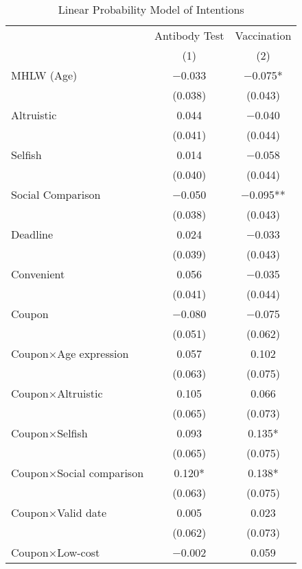 \begin{table}

\caption{Linear Probability Model of Intentions \label{tab:int-reg}}
\centering
\fontsize{9}{11}\selectfont
\begin{threeparttable}
\begin{tabular}[t]{lcc}
\toprule
\multicolumn{1}{c}{ } & \multicolumn{1}{c}{Antibody Test} & \multicolumn{1}{c}{Vaccination} \\
\cmidrule(l{3pt}r{3pt}){2-2} \cmidrule(l{3pt}r{3pt}){3-3}
  & (1) & (2)\\
\midrule
MHLW (Age) & \num{-0.033} & \num{-0.075}*\\
 & (\num{0.038}) & \vphantom{1} (\num{0.043})\\
Altruistic & \num{0.044} & \num{-0.040}\\
 & (\num{0.041}) & \vphantom{1} (\num{0.044})\\
Selfish & \num{0.014} & \num{-0.058}\\
 & (\num{0.040}) & (\num{0.044})\\
Social Comparison & \num{-0.050} & \num{-0.095}**\\
 & (\num{0.038}) & (\num{0.043})\\
Deadline & \num{0.024} & \num{-0.033}\\
 & (\num{0.039}) & (\num{0.043})\\
Convenient & \num{0.056} & \num{-0.035}\\
 & (\num{0.041}) & (\num{0.044})\\
Coupon & \num{-0.080} & \num{-0.075}\\
 & (\num{0.051}) & (\num{0.062})\\
Coupon×Age expression & \num{0.057} & \num{0.102}\\
 & (\num{0.063}) & \vphantom{1} (\num{0.075})\\
Coupon×Altruistic & \num{0.105} & \num{0.066}\\
 & (\num{0.065}) & (\num{0.073})\\
Coupon×Selfish & \num{0.093} & \num{0.135}*\\
 & (\num{0.065}) & (\num{0.075})\\
Coupon×Social comparison & \num{0.120}* & \num{0.138}*\\
 & (\num{0.063}) & (\num{0.075})\\
Coupon×Valid date & \num{0.005} & \num{0.023}\\
 & (\num{0.062}) & (\num{0.073})\\
Coupon×Low-cost & \num{-0.002} & \num{0.059}\\

\end{tabular}
\end{threeparttable}
\end{table}
